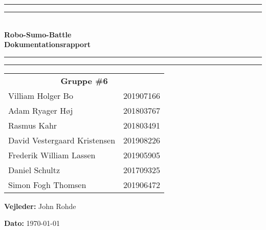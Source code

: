 \newcommand\mymaketitle[1]{
   \rule{\textwidth}{1.6pt}\vspace*{-\baselineskip}\vspace*{2pt}
   \rule{\textwidth}{0.4pt}
   \\   
   {\huge \bf #1}\\
   \rule{\textwidth}{0.4pt}\vspace*{-\baselineskip}\vspace{3.2pt}
   \rule{\textwidth}{1.6pt}
}

\begin{titlepage}
    \begin{center}
        \vspace*{2cm}
        
        \mymaketitle{Robo-Sumo-Battle\\Dokumentationsrapport}
        \vspace{3cm}
        
        \large
        \begin{tabular}{ll}
            \multicolumn{2}{c}{\textbf{Gruppe \#6}}\\
            Villiam Holger Bo & 201907166\\
            Adam Ryager Høj & 201803767\\
            Rasmus Kahr & 201803491\\
            David Vestergaard Kristensen & 201908226\\
            Frederik William Lassen & 201905905\\
            Daniel Schultz & 201709325\\
            Simon Fogh Thomsen & 201906472
        \end{tabular}
        \vspace{0.4cm}
        
        \textbf{Vejleder:} John Rohde
        \vspace{0.4cm}
        
        \textbf{Dato:} \today
        \vfill
    \end{center}
\end{titlepage}